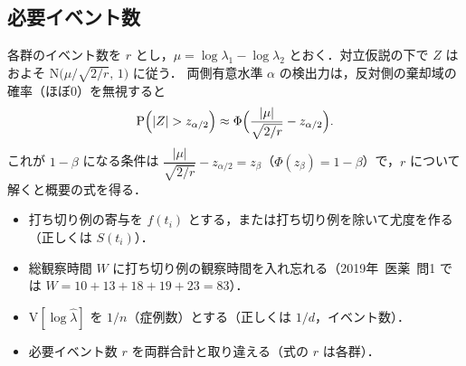 \documentclass[a4paper,11pt,openany]{ltjsbook}
\newcommand{\kakomon}[2]{\mbox{#1年 医薬 問#2}}
\newcommand{\V}{\mathrm{V}}
\newcommand{\Prob}{\mathrm{P}}
\newcommand{\Normal}{\mathrm{N}}
\begin{document}
\subsection{必要イベント数}\label{subsec:m01-events}
各群のイベント数を $r$ とし，$\mu=\log\lambda_1-\log\lambda_2$ とおく．対立仮説の下で $Z$ はおよそ $\Normal\bigl(\mu/\sqrt{2/r},\,1\bigr)$ に従う．
両側有意水準 $\alpha$ の検出力は，反対側の棄却域の確率（ほぼ0）を無視すると
\[
\Prob\Bigl(|Z|>z_{\alpha/2}\Bigr)\approx\Phi\Bigl(\frac{|\mu|}{\sqrt{2/r}}-z_{\alpha/2}\Bigr).
\]
これが $1-\beta$ になる条件は $\dfrac{|\mu|}{\sqrt{2/r}}-z_{\alpha/2}=z_\beta$（$\Phi(z_\beta)=1-\beta$）で，$r$ について解くと概要の式を得る．

\begin{warnbox}
\begin{itemize}
\item 打ち切り例の寄与を $f(t_i)$ とする，または打ち切り例を除いて尤度を作る（正しくは $S(t_i)$）．
\item 総観察時間 $W$ に打ち切り例の観察時間を入れ忘れる（\kakomon{2019}{1} では $W=10+13+18+19+23=83$）．
\item $\V[\log\hat\lambda]$ を $1/n$（症例数）とする（正しくは $1/d$，イベント数）．
\item 必要イベント数 $r$ を両群合計と取り違える（式の $r$ は各群）．
\end{itemize}
\end{warnbox}

\end{document}
